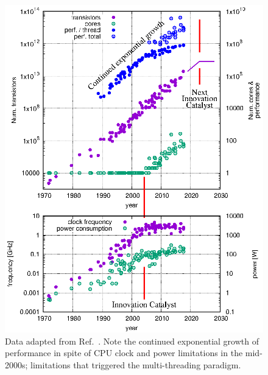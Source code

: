 \documentclass{article}
\begin{document}
\begin{figure}
	\vspace{-1.5\baselineskip}
	\centerline{ \includegraphics[clip,trim={-2cm -2cm 1.5cm 1.5cm},width=\linewidth]{./figs/plotting.technology.eps} }
	\vspace{-1\baselineskip}
	\caption{
		\label{fig::technology} 
		Data adapted from Ref.~\cite{MicroprocessorTrendData}. Note the continued exponential growth of performance in spite of CPU clock and power limitations in the mid-2000s; limitations that triggered the multi-threading paradigm.
	}
\end{figure}
\end{document}
